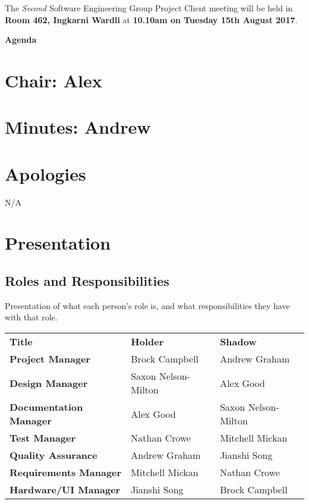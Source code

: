 \documentclass[11pt, a4paper]{article}
\newcommand{\meetingno}{Second}
\newcommand{\meetinglocation}{Room 462, Ingkarni Wardli} %
\newcommand{\meetingdatetime}{10.10am on Tuesday 15th August 2017} %
\newcommand{\meetingchair}{ Alex } %
\newcommand{\meetingminutes}{ Andrew }
\begin{document}
  \noindent The {\em \meetingno} Software Engineering Group Project Client meeting will be held in {\bf \meetinglocation } at {\bf \meetingdatetime }.

  \vspace*{15pt}

  \begin{center}
  \huge \bf Agenda
  \end{center}


\begin{flushleft}

  \section*{Chair: \meetingchair }
  \section*{Minutes: \meetingminutes }
  

  \vspace*{10pt}

  \section{Apologies}
  N/A %

  \section{Presentation}
  
  \subsection{Roles and Responsibilities}
  Presentation of what each person's role is, and what responsibilities they have with that role.
  \linebreak \linebreak
  \begin{tabular}{lll}
	\textbf{Title} & \textbf{Holder} & \textbf{Shadow} \\
	\textbf{Project Manager} & Brock Campbell & Andrew Graham \\
	\textbf{Design Manager} & Saxon Nelson-Milton & Alex Good \\
	\textbf{Documentation Manager} & Alex Good & Saxon Nelson-Milton \\
	\textbf{Test Manager} & Nathan Crowe & Mitchell Mickan \\
	\textbf{Quality Assurance} & Andrew Graham & Jianshi Song \\
	\textbf{Requirements Manager} & Mitchell Mickan & Nathan Crowe \\
    \textbf{Hardware/UI Manager} & Jianshi Song & Brock Campbell \\
	\end{tabular} 
    \linebreak
  

\end{flushleft}
\end{document}
